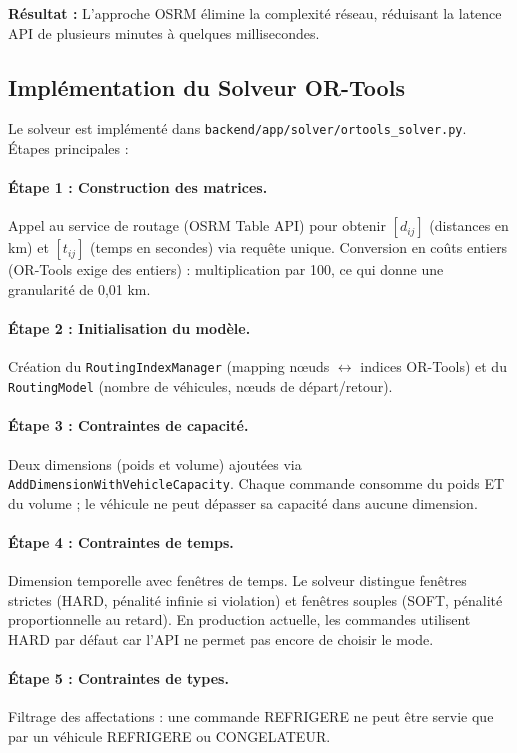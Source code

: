 \documentclass[12pt,a4paper]{report}
\begin{document}
\textbf{Résultat :} L'approche OSRM élimine la complexité réseau, réduisant la latence API de plusieurs minutes à quelques millisecondes.

\subsection{Implémentation du Solveur OR-Tools}

Le solveur est implémenté dans \texttt{backend/app/solver/ortools\_solver.py}. Étapes principales :

\paragraph{Étape 1 : Construction des matrices.}
Appel au service de routage (OSRM Table API) pour obtenir $[d_{ij}]$ (distances en km) et $[t_{ij}]$ (temps en secondes) via requête unique. Conversion en coûts entiers (OR-Tools exige des entiers) : multiplication par 100, ce qui donne une granularité de 0,01 km.

\paragraph{Étape 2 : Initialisation du modèle.}
Création du \texttt{RoutingIndexManager} (mapping nœuds $\leftrightarrow$ indices OR-Tools) et du \texttt{RoutingModel} (nombre de véhicules, nœuds de départ/retour).

\paragraph{Étape 3 : Contraintes de capacité.}
Deux dimensions (poids et volume) ajoutées via \texttt{AddDimensionWithVehicleCapacity}. Chaque commande consomme du poids ET du volume ; le véhicule ne peut dépasser sa capacité dans aucune dimension.

\paragraph{Étape 4 : Contraintes de temps.}
Dimension temporelle avec fenêtres de temps. Le solveur distingue fenêtres strictes (HARD, pénalité infinie si violation) et fenêtres souples (SOFT, pénalité proportionnelle au retard). En production actuelle, les commandes utilisent HARD par défaut car l'API ne permet pas encore de choisir le mode.

\paragraph{Étape 5 : Contraintes de types.}
Filtrage des affectations : une commande REFRIGERE ne peut être servie que par un véhicule REFRIGERE ou CONGELATEUR.
\end{document}
